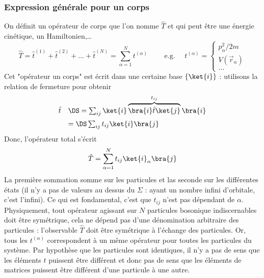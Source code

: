 \subsubsection{Expression générale pour un corps}
On définit un opérateur de corps que l'on nomme $\hat{T}$ et qui peut être une énergie cinétique, 
un Hamiltonien,\dots
\begin{equation}
\hat{T} = \hat{t}^{(1)}+\hat{t}^{(2)}+\dots+\hat{t}^{(N)}=\sum_{\alpha=1}^N t^{(\alpha)}\qquad 
\text{ e.g. } \quad t^{(\alpha)} = \left\{\begin{array}{l}
p_\alpha^2/2m\\
V(\vec{r}_\alpha)\\
\dots
\end{array}\right.
\end{equation}
Cet "opérateur un corps" est écrit dans une certaine base $\{\ket{i}\}$ : utilisons la relation de fermeture pour 
obtenir
\begin{equation}
\begin{array}{ll}
\hat{t} &\DS= \sum_{ij} \ket{i}\overbrace{\bra{i}\hat{t}\ket{j}}^{t_{ij}}\bra{i}\vspace{2mm}\\
&=\DS\sum_{ij} t_{ij}\ket{i}\bra{j}
\end{array}
\end{equation}
Donc, l'opérateur total s'écrit
\begin{equation}
\hat{T} = \sum_{\alpha=1}^N t_{ij}\ket{i}_\alpha\bra{j}
\end{equation}
La première sommation somme sur les particules et las seconde sur les différentes états (il  n'y a pas 
de valeurs au dessus du $\Sigma$ : ayant un nombre infini d'orbitale, c'est l'infini). Ce qui est 
fondamental, c'est que $t_{ij}$ n'est pas dépendant de $\alpha$.\\

Physiquement, tout opérateur agissant sur $N$ particules bosonique indiscernables doit être symétrique, cela ne 
dépend pas d'une dénomination arbitraire des particules : l'observable $\hat{T}$ doit être symétrique à 
l'échange des particules. Or, tous les $t^{(\alpha)}$ correspondent à un même opérateur pour toutes les 
particules du système. Par hypothèse que les particules sont identiques, il n'y a pas de sens que les éléments $t$ puissent être 
différent et donc pas de sens que les éléments de matrices puissent être différent d'une particule à une autre.\\

